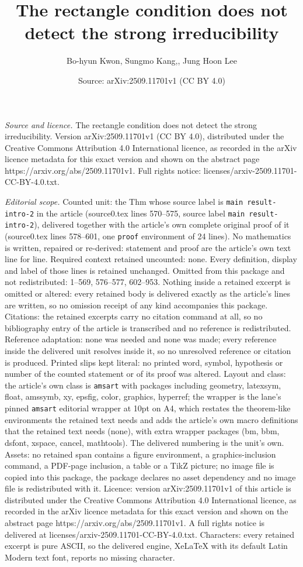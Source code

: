 \documentclass[10pt,a4paper]{amsart}
\title[The rectangle condition does not detect the strong irreducib]{The rectangle condition does not detect the strong irreducibility}
\author{Bo-hyun Kwon, Sungmo Kang,, Jung Hoon Lee}
\date{Source: arXiv:2509.11701v1 (CC BY 4.0)}
\begin{document}
\maketitle

\noindent\emph{Source and licence.} The rectangle condition does not detect the strong irreducibility. Version arXiv:2509.11701v1 (CC BY 4.0), distributed under the Creative Commons Attribution 4.0 International licence, as recorded in the arXiv licence metadata for this exact version and shown on the abstract page https://arxiv.org/abs/2509.11701v1. Full rights notice: licenses/arxiv-2509.11701-CC-BY-4.0.txt.\par\smallskip

\noindent\textit{Editorial scope.} Counted unit: the Thm whose source label is \texttt{main result-intro-2} in the article (source0.tex lines 570--575, source label \texttt{main result-intro-2}), delivered together with the article's own complete original proof of it (source0.tex lines 578--601, one \texttt{proof} environment of 24 lines). No mathematics is written, repaired or re-derived: statement and proof are the article's own text line for line. Required context retained uncounted: none. Every definition, display and label of those lines is retained unchanged. Omitted from this package and not redistributed: 1--569, 576--577, 602--953. Nothing inside a retained excerpt is omitted or altered: every retained body is delivered exactly as the article's lines are written, so no omission receipt of any kind accompanies this package. Citations: the retained excerpts carry no citation command at all, so no bibliography entry of the article is transcribed and no reference is redistributed. Reference adaptation: none was needed and none was made; every reference inside the delivered unit resolves inside it, so no unresolved reference or citation is produced. Printed slips kept literal: no printed word, symbol, hypothesis or number of the counted statement or of its proof was altered. Layout and class: the article's own class is \texttt{amsart} with packages including geometry, latexsym, float, amssymb, xy, epsfig, color, graphics, hyperref; the wrapper is the lane's pinned \texttt{amsart} editorial wrapper at 10pt on A4, which restates the theorem-like environments the retained text needs and adds the article's own macro definitions that the retained text needs (none), with extra wrapper packages (bm, bbm, dsfont, xspace, cancel, mathtools). The delivered numbering is the unit's own. Assets: no retained span contains a figure environment, a graphics-inclusion command, a PDF-page inclusion, a table or a TikZ picture; no image file is copied into this package, the package declares no asset dependency and no image file is redistributed with it. Licence: version arXiv:2509.11701v1 of this article is distributed under the Creative Commons Attribution 4.0 International licence, as recorded in the arXiv licence metadata for this exact version and shown on the abstract page https://arxiv.org/abs/2509.11701v1. A full rights notice is delivered at licenses/arxiv-2509.11701-CC-BY-4.0.txt. Characters: every retained excerpt is pure ASCII, so the delivered engine, XeLaTeX with its default Latin Modern text font, reports no missing character.
\end{document}
